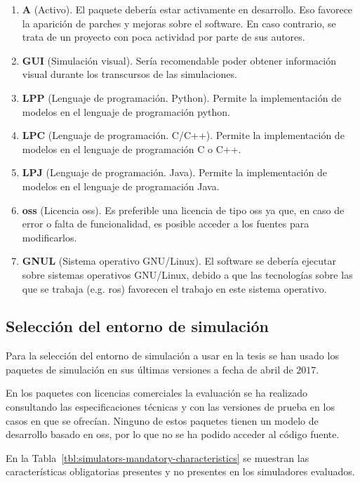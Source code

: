 \begin{enumerate}
	\item \textbf{A} (Activo). El paquete debería estar activamente en desarrollo. Eso favorece la aparición de parches y mejoras sobre el software. En caso contrario, se trata de un proyecto con poca actividad por parte de sus autores.
	\item \textbf{GUI} (Simulación visual). Sería recomendable poder obtener información visual durante los transcursos de las simulaciones.
	\item \textbf{LPP} (Lenguaje de programación. Python). Permite la implementación de modelos en el lenguaje de programación \gls{python}.
	\item \textbf{LPC} (Lenguaje de programación. C/C++). Permite la implementación de modelos en el lenguaje de programación C o C++.
	\item \textbf{LPJ} (Lenguaje de programación. Java). Permite la implementación de modelos en el lenguaje de programación Java.
	\item \textbf{\acrshort{oss}} (Licencia \acrshort{oss}). Es preferible una licencia de tipo \acrfull{oss} ya que, en caso de error o falta de funcionalidad, es posible acceder a los fuentes para modificarlos.
	\item \textbf{GNUL} (Sistema operativo GNU/Linux). El software se debería ejecutar sobre sistemas operativos GNU/Linux, debido a que las tecnologías sobre las que se trabaja (e.g. \acrshort{ros}) favorecen el trabajo en este sistema operativo.
\end{enumerate}

\subsection{Selección del entorno de simulación}

Para la selección del entorno de simulación a usar en la tesis se han usado los paquetes de simulación en sus últimas versiones a fecha de abril de $2017$.

En los paquetes con licencias comerciales la evaluación se ha realizado consultando las especificaciones técnicas y con las versiones de prueba en los casos en que se ofrecían. Ninguno de estos paquetes tienen un modelo de desarrollo basado en \gls{oss}, por lo que no se ha podido acceder al código fuente.

En la Tabla~\ref{tbl:simulators-mandatory-characteristics} se muestran las características obligatorias presentes y no presentes en los simuladores evaluados.

